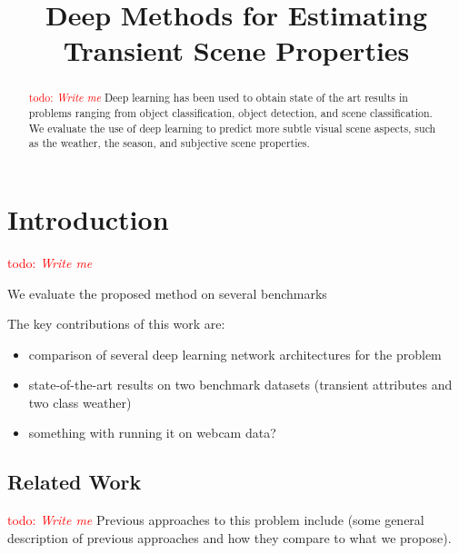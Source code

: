 \documentclass{article}
\title{Deep Methods for Estimating Transient Scene Properties}
\newcommand{\todo}[1]{\textcolor{red}{todo: {\em #1}}}
\begin{document}
%
\maketitle
%
\begin{abstract}
	
	\todo{Write me}
  Deep learning has been used to obtain state of the art results in
  problems ranging from object classification, object detection, and
  scene classification. We evaluate the use of deep learning to
  predict more subtle visual scene aspects, such as the weather, the
  season, and subjective scene properties. 

\end{abstract}
%
\begin{keywords}
\end{keywords}

\section{Introduction}

\todo{Write me}


We evaluate the proposed method on several benchmarks 


The key contributions of this work are:
\begin{itemize}

  \item comparison of several deep learning network architectures for
    the problem

  \item state-of-the-art results on two benchmark datasets (transient
    attributes and two class weather)

  \item something with running it on webcam data?

\end{itemize}

\subsection{Related Work}

\todo{Write me}
Previous approaches to this problem include (some general description
of previous approaches and how they compare to what we propose).
\end{document}
